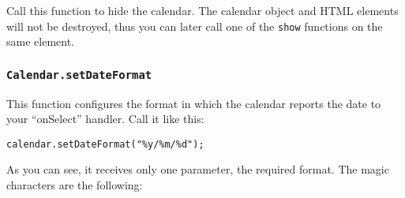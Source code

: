\documentclass[a4paper,10pt]{article}
\begin{document}
Call this function to hide the calendar.  The calendar object and HTML elements
will not be destroyed, thus you can later call one of the \texttt{show}
functions on the same element.

\subsubsection{\texttt{Calendar.setDateFormat}}\label{sec:Calendar.setDateFormat}

This function configures the format in which the calendar reports the date to
your ``onSelect'' handler.  Call it like this:

\begin{verbatim}
calendar.setDateFormat("%y/%m/%d");
\end{verbatim}

As you can see, it receives only one parameter, the required format.  The magic
characters are the following:
\end{document}
